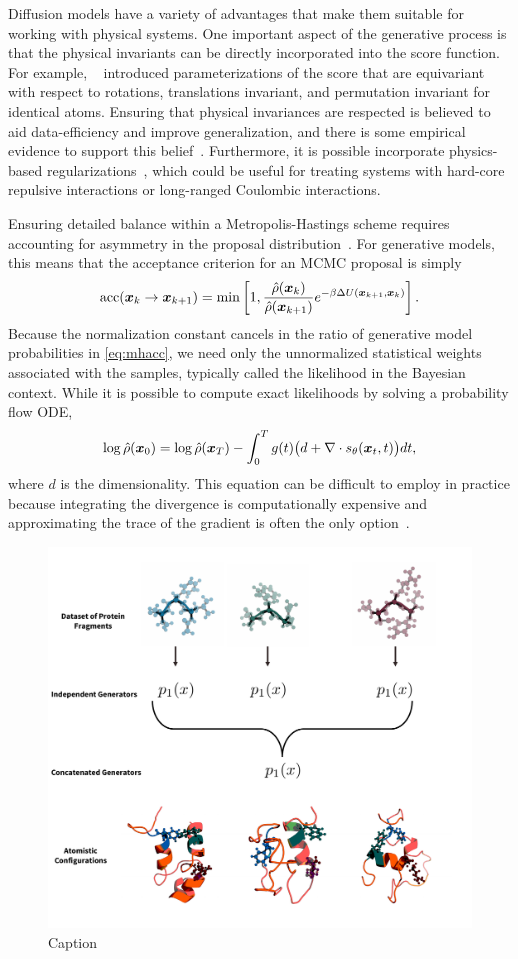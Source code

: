 \documentclass[11pt]{article}
\begin{document}
Diffusion models have a variety of advantages that make them suitable for working with physical systems. 
One important aspect of the generative process is that the physical invariants can be directly incorporated into the score function.
For example, ~\cite{schneuing_structure-based_2022,weiss_guided_2023} introduced parameterizations of the score that are equivariant with respect to rotations, translations invariant, and permutation invariant for identical atoms.
Ensuring that physical invariances are respected is believed to aid data-efficiency and improve generalization, and there is some empirical evidence to support this belief~\cite{sannai_improved_2021}.
Furthermore, it is possible incorporate physics-based regularizations~\cite{zheng_towards_2023}, which could be useful for treating systems with hard-core repulsive interactions or long-ranged Coulombic interactions.

Ensuring detailed balance within a Metropolis-Hastings scheme requires accounting for asymmetry in the proposal distribution~\cite{frenkel_understanding_2002}.
For generative models, this means that the acceptance criterion for an MCMC proposal is simply
\begin{equation}
    \textrm{acc}(\boldsymbol{x}_{k} \to \boldsymbol{x}_{k+1}) = \min \left[ 1, \frac{\hat{\rho}(\boldsymbol{x}_{k})}{\hat{\rho}(\boldsymbol{x}_{k+1})} e^{-\beta \Delta U(\boldsymbol{x}_{k+1},\boldsymbol{x}_k)} \right].
    \label{eq:mhacc}
\end{equation}
Because the normalization constant cancels in the ratio of generative model probabilities in \eqref{eq:mhacc}, we need only the unnormalized statistical weights associated with the samples, typically called the likelihood in the Bayesian context.
While it is possible to compute exact likelihoods by solving a probability flow ODE, 
\begin{equation}
    \log \hat\rho(\boldsymbol{x}_0) = \log \hat\rho(\boldsymbol{x}_T) - \int_0^T g(t) \bigl( d + \nabla \cdot s_{\theta}(\boldsymbol{x}_t,t) \bigr) dt,
    \label{eq:pfode}
\end{equation}
where $d$ is the dimensionality.
This equation can be difficult to employ in practice because integrating the divergence is computationally expensive and approximating the trace of the gradient is often the only option~\cite{grathwohl_ffjord_2018}. 

\begin{figure}
    \centering
    \includegraphics[width=0.6\linewidth]{modular_fig.pdf}
    \caption{Caption}
    \label{fig:enter-label}
\end{figure}
\end{document}
